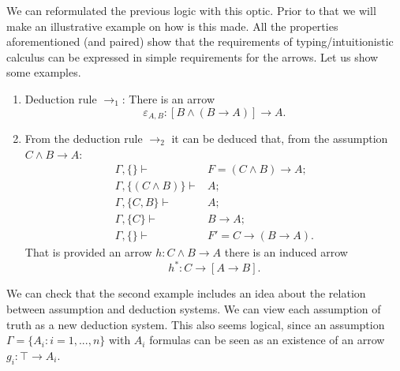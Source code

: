 We can reformulated the previous logic with this optic. Prior to that we will make an illustrative example on how is this made. All the properties aforementioned (and paired) show that the requirements of typing/intuitionistic calculus can be expressed in simple requirements for the arrows. Let us show some examples.
\begin{example}
  \begin{enumerate}
  \item Deduction rule $\to_1$: There is an arrow $$\varepsilon_{A,B}: [B\land (B \to A)] \to A.$$
  \item From the deduction rule $\to_2$ it can be deduced that, from the assumption $C \land B \to A$:
    \begin{align*}
      \Gamma,\{\} \vdash & F= (C\land B)\to A;\\
      \Gamma, \{(C\land B)\} \vdash & A;\\
      \Gamma, \{C, B\} \vdash & A;\\
      \Gamma, \{C\} \vdash & B\to A;\\
      \Gamma, \{\} \vdash & F'=C \to (B \to A).
    \end{align*}
    That is provided an arrow $h: C\land B \to A$ there is an induced arrow
    $$h^*:C \to [A\to B].$$
  \end{enumerate}
\end{example}

We can check that the second example includes an idea about the relation between assumption and deduction systems. We can view each assumption of truth as a new deduction system. This also seems logical, since an assumption $\Gamma = \{A_i : i=1,...,n\}$  with $A_i$ formulas can be seen as an existence of an arrow $g_i: \top \to A_i$.\\




